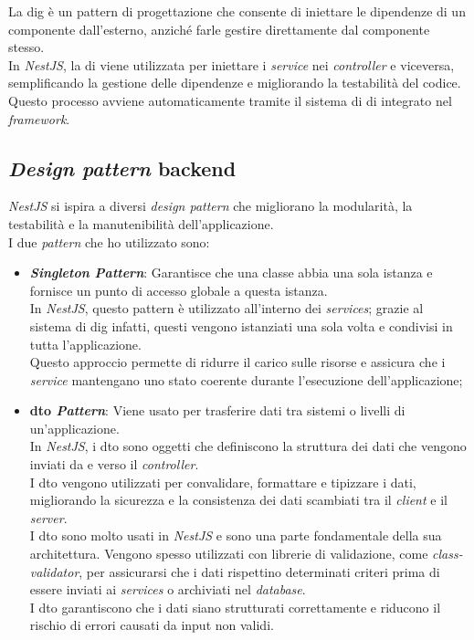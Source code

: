 \noindent La \gls{dig} è un pattern di progettazione che consente di iniettare le dipendenze di un componente dall'esterno, anziché farle gestire direttamente dal componente stesso. \\
In \textit{NestJS}, la \gls{di} viene utilizzata per iniettare i \textit{service} nei \textit{controller} e viceversa, semplificando la gestione delle dipendenze e migliorando la testabilità del codice. \\
Questo processo avviene automaticamente tramite il sistema di \gls{di} integrato nel \textit{framework}.

\pagebreak
\subsection*{\textit{Design pattern} backend}

\textit{NestJS} si ispira a diversi \textit{design pattern} che migliorano la modularità, la testabilità e la manutenibilità dell'applicazione.\\

\noindent I due \textit{pattern} che ho utilizzato sono:
\begin{itemize}
    \item \textbf{\textit{Singleton Pattern}}: Garantisce che una classe abbia una sola istanza e fornisce un punto di accesso globale a questa istanza.\\
    In \textit{NestJS}, questo pattern è utilizzato all'interno dei \textit{services};
    grazie al sistema di \gls{dig} infatti, questi vengono istanziati una sola volta e condivisi in tutta l'applicazione.\\
    Questo approccio permette di ridurre il carico sulle risorse e assicura che i \textit{service} mantengano uno stato coerente durante l'esecuzione dell'applicazione;
    \item \textbf{\gls{dto} \textit{Pattern}}: Viene usato per trasferire dati tra sistemi o livelli di un'applicazione.\\
    In \textit{NestJS}, i \gls{dto} sono oggetti che definiscono la struttura dei dati che vengono inviati da e verso il \textit{controller}.\\
    I \gls{dto} vengono utilizzati per convalidare, formattare e tipizzare i dati, migliorando la sicurezza e la consistenza dei dati scambiati tra il \textit{client} e il \textit{server}. \\
    I \gls{dto} sono molto usati in \textit{NestJS} e sono una parte fondamentale della sua architettura. Vengono spesso utilizzati con librerie di validazione, come \textit{class-validator}, per assicurarsi che i dati rispettino determinati criteri prima di essere inviati ai \textit{services} o archiviati nel \textit{database}.\\
    I \gls{dto} garantiscono che i dati siano strutturati correttamente e riducono il rischio di errori causati da input non validi.    
\end{itemize}
